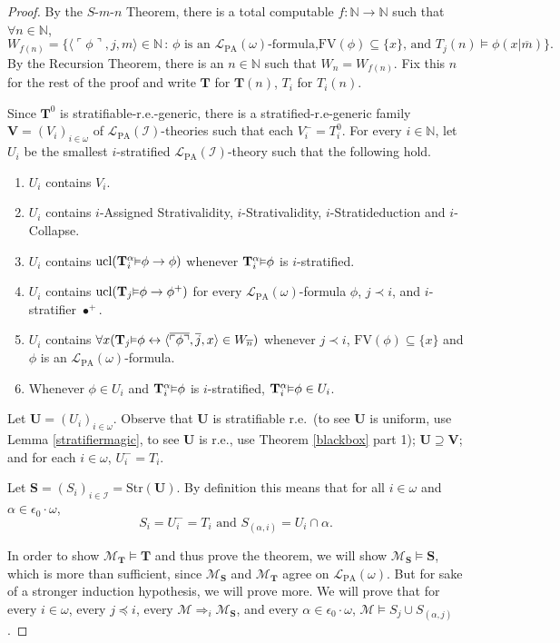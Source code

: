 \documentclass[reqno]{article}
\theoremstyle{definition}
\def\N{\mathbb{N}}
\def\L{\mathscr{L}}
\def\M{\mathscr{M}}
\def\T{\mathbf{T}}
\def\S{\mathbf{S}}
\def\U{\mathbf{U}}
\def\V{\mathbf{V}}
\def\FV{\mathrm{FV}}
\def\LPA{\L_{\mathrm{PA}}}
\def\epom{\epsilon_0\cdot\omega}
\def\indset{\mathcal I}
\def\myequiv{\Rightarrow}
\renewcommand{\Pr}[1]{\T_{#1}\mbox{\small${\vDash}$}}
\newcommand{\Prr}[2]{\T^{#1}_{#2}\mbox{\small${\vDash}$}}
\newcommand{\ucl}[1]{\mathrm{ucl}(#1)}
\newcommand{\str}[1]{\mathrm{Str}(#1)} \newcommand{\Str}[1]{\str{#1}}
\begin{document}
\begin{proof}
By the $S$-$m$-$n$ Theorem, there is a total computable $f:\N\to\N$ such that $\forall n\in\N$,
\[
W_{f(n)}=\{\langle\ulcorner\phi\urcorner,j,m\rangle\in\N\,:\,\mbox{$\phi$ is an $\LPA(\omega)$-formula,
$\FV(\phi)\subseteq\{x\}$, and $T_j(n)\models\phi(x|\overline m)$}\}.
\]
By the Recursion Theorem, there is an $n\in\N$ such that $W_n=W_{f(n)}$.  Fix this $n$ for the rest of the proof
and write $\T$ for $\T(n)$, $T_i$ for $T_i(n)$.

Since $\T^0$ is stratifiable-r.e.-generic, there is 
a stratified-r.e-generic
family $\V=(V_i)_{i\in\omega}$ of $\LPA(\indset)$-theories such that each $V^-_i=T^0_i$.
For every $i\in\N$, let $U_i$ be the smallest
$i$-stratified $\LPA(\indset)$-theory such that the following hold.
\begin{enumerate}
\item $U_i$ contains $V_i$.
\item $U_i$ contains $i$-Assigned Strativalidity, $i$-Strativalidity, $i$-Stratideduction and $i$-Collapse.
\item $U_i$ contains $\ucl{\Prr\alpha i\phi\rightarrow\phi}$ whenever $\Prr\alpha i\phi$ is $i$-stratified.
\item $U_i$ contains $\ucl{\Pr j\phi\rightarrow\phi^+}$ for every $\LPA(\omega)$-formula $\phi$, $j\prec i$,
and $i$-stratifier $\bullet^+$.
\item $U_i$ contains $\forall x(\Pr j\phi\leftrightarrow\langle\overline{\ulcorner\phi\urcorner},\overline j,x\rangle\in W_{\overline n})$
whenever $j\prec i$, $\FV(\phi)\subseteq\{x\}$ and $\phi$ is an $\LPA(\omega)$-formula.
\item Whenever $\phi\in U_i$ and $\Prr\alpha i\phi$ is $i$-stratified, $\Prr\alpha i\phi\in U_i$.
\end{enumerate}
Let $\U=(U_i)_{i\in\omega}$.  Observe that $\U$ is stratifiable r.e.~(to see $\U$ is uniform, use
Lemma \ref{stratifiermagic}, to see $\U$ is r.e., use Theorem \ref{blackbox} part 1); $\U\supseteq\V$; and for each $i\in\omega$,
$U_i^-=T_i$.


Let $\S=(S_i)_{i\in\indset}=\str{\U}$.
By definition this means that for all $i\in\omega$ and $\alpha\in\epom$,
\[S_i=U_i^-=T_i\mbox{ and }S_{(\alpha,i)}=U_i\cap\alpha.
\]

In order to show $\M_\T\models\T$ and thus prove the theorem,
we will show $\M_\S\models\S$, which is more than sufficient, since 
$\M_\S$ and $\M_\T$ agree on $\LPA(\omega)$.
But for sake of a stronger induction hypothesis, we will prove 
more.  We will prove that for every $i\in\omega$, every $j\preceq i$,
every $\M\myequiv_i\M_\S$, and every $\alpha\in\epom$,
$\M\models S_j\cup S_{(\alpha,j)}$.


\end{proof}
\end{document}
